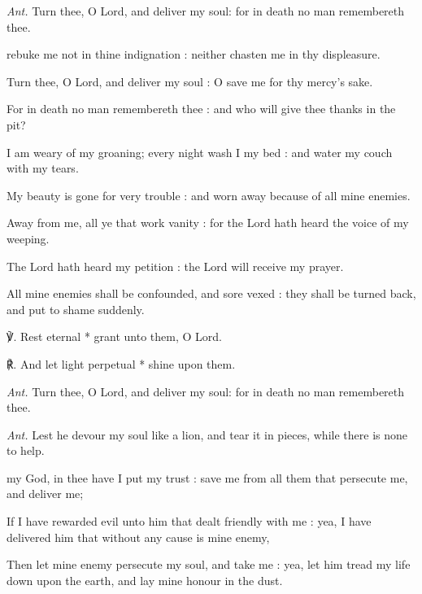 \textit{Ant.} Turn thee, {\dag} O Lord, and deliver my soul: for in death no man remembereth thee.\par
{} rebuke me not in thine indignation : neither chasten me in thy displeasure.\par
{}
Turn thee, O Lord, and deliver my soul : O save me for thy mercy's sake.\par
{}For in death no man remembereth thee : and who will give thee thanks in the pit?\par
{}I am weary of my groaning; every night wash I my bed : and water my couch with my tears.\par
{}My beauty is gone for very trouble : and worn away because of all mine enemies.\par
{}Away from me, all ye that work vanity : for the Lord hath heard the voice of my weeping.\par
{}The Lord hath heard my petition : the Lord will receive my prayer.\par
{}All mine enemies shall be confounded, and sore vexed : they shall be turned back, and put to shame suddenly.\par
℣. Rest eternal * grant unto them, O Lord.\par
℟. And let light perpetual * shine upon them.\par\noindent
\textit{Ant.} Turn thee, O Lord, and deliver my soul: for in death no man remembereth thee.\par
{}\par\noindent
\textit{Ant.} Lest he devour {\dag} my soul like a lion, and tear it in pieces, while there is none to help.\par
{} my God, in thee have I put my trust : save me from all them that persecute me, and deliver me;\par
{}
If I have rewarded evil unto him that dealt friendly with me : yea, I have delivered him that without any cause is mine enemy,\par
{}Then let mine enemy persecute my soul, and take me : yea, let him tread my life down upon the earth, and lay mine honour in the dust.\par
